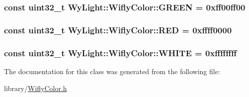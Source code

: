 \hypertarget{class_wy_light_1_1_wifly_color_af89b913336910c06935b86bbf64a5a97}{
\subsubsection[{G\-R\-E\-E\-N}]{\setlength{\rightskip}{0pt plus 5cm}const uint32\-\_\-t Wy\-Light\-::\-Wifly\-Color\-::\-G\-R\-E\-E\-N = 0xff00ff00\hspace{0.3cm}{\ttfamily [static]}}}\label{class_wy_light_1_1_wifly_color_af89b913336910c06935b86bbf64a5a97}
\hypertarget{class_wy_light_1_1_wifly_color_a8d3be283a5ee05b7e784985c13f7fbaa}{
\subsubsection[{R\-E\-D}]{\setlength{\rightskip}{0pt plus 5cm}const uint32\-\_\-t Wy\-Light\-::\-Wifly\-Color\-::\-R\-E\-D = 0xffff0000\hspace{0.3cm}{\ttfamily [static]}}}\label{class_wy_light_1_1_wifly_color_a8d3be283a5ee05b7e784985c13f7fbaa}
\hypertarget{class_wy_light_1_1_wifly_color_abbc2200bd5bcccb8f3ed8f2c0e1b5d71}{
\subsubsection[{W\-H\-I\-T\-E}]{\setlength{\rightskip}{0pt plus 5cm}const uint32\-\_\-t Wy\-Light\-::\-Wifly\-Color\-::\-W\-H\-I\-T\-E = 0xffffffff\hspace{0.3cm}{\ttfamily [static]}}}\label{class_wy_light_1_1_wifly_color_abbc2200bd5bcccb8f3ed8f2c0e1b5d71}


The documentation for this class was generated from the following file\-:\begin{DoxyCompactItemize}
\item 
library/\hyperlink{_wifly_color_8h}{Wifly\-Color.\-h}\end{DoxyCompactItemize}
